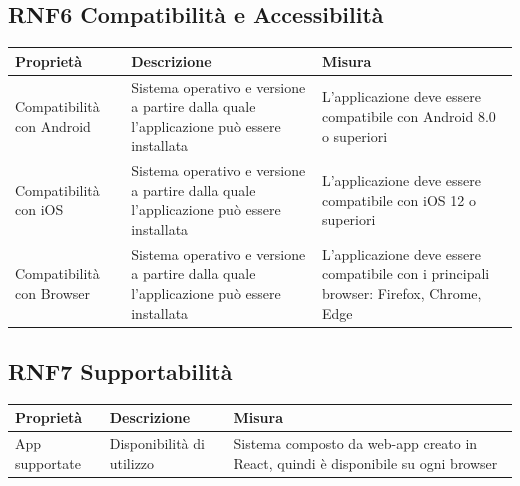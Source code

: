 \documentclass{article}
\begin{document}
\subsection{RNF6 Compatibilità e Accessibilità}
\begin{center}
    \begin{longtable}{|p{4cm}|p{8cm}|p{4cm}|}
        \hline
        Proprietà                 & Descrizione                                                                             & Misura                                                                                 \\
        \hline
        Compatibilità con Android & Sistema operativo e versione a partire dalla quale l'applicazione può essere installata & L'applicazione deve essere compatibile con Android 8.0 o superiori                     \\
        \hline
        Compatibilità con iOS     & Sistema operativo e versione a partire dalla quale l'applicazione può essere installata & L'applicazione deve essere compatibile con iOS 12 o superiori                          \\
        \hline
        Compatibilità con Browser & Sistema operativo e versione a partire dalla quale l'applicazione può essere installata & L'applicazione deve essere compatibile con i principali browser: Firefox, Chrome, Edge \\
        \hline
    \end{longtable}
\end{center}
\subsection{RNF7 Supportabilità}
\begin{center}
    \begin{longtable}{|p{4cm}|p{8cm}|p{4cm}|}
        \hline
        Proprietà      & Descrizione               & Misura                                                                            \\
        \hline
        App supportate & Disponibilità di utilizzo & Sistema composto da web-app creato in React, quindi è disponibile su ogni browser \\
        \hline
    \end{longtable}
\end{center}
\end{document}
